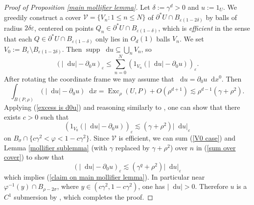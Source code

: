 \documentclass[reqno,11pt]{amsart}
\DeclareMathOperator{\Exc}{Exc}
\DeclareMathOperator{\supp}{supp}
\newcommand*\dif{\mathop{}\!\mathrm{d}}
\newcommand{\dfn}[1]{\emph{#1}\index{#1}}
\theoremstyle{definition}
\numberwithin{equation}{section}
\begin{document}
\begin{proof}[Proof of Proposition \ref{main mollifier lemma}]
Let $\delta := \gamma^d > 0$ and $u := 1_U$.
We greedily construct a cover $\mathcal V = \{V_n: 1 \leq n \leq N\}$ of $\partial^* U \cap B_{\varepsilon(1 - 2\delta)}$ by balls of radius $2\delta\varepsilon$, centered on points $Q_n \in \partial^* U \cap B_{\varepsilon(1 - \delta)}$, which is \dfn{efficient} in the sense that each $Q \in \partial^*U \cap B_{\varepsilon(1 - \delta)}$ only lies in $O_d(1)$ balls $V_n$.
We set $V_0 := B_\varepsilon \setminus B_{\varepsilon(1 - 2\delta)}$.
Then $\supp \dif u \subseteq \bigcup_n V_n$, so
\begin{equation}\label{sum over cover}
(|\dif u| - \partial_0 u)_\varepsilon \leq \sum_{n = 0}^N (1_{V_n} (|\dif u| - \partial_0 u))_\varepsilon.
\end{equation}
After rotating the coordinate frame we may assume that $\dif u = \partial_0 u \dif x^0$. Then
\begin{equation}\label{excess is d0u}
    \int_{B(P, \rho)} (|\dif u| - \partial_0 u) \dif x = \Exc_\rho(U, P) + O(\rho^{d + 1}) \lesssim \rho^{d - 1}(\gamma + \rho^2).
\end{equation}
Applying (\ref{excess is d0u}) and reasoning similarly to \cite[pg92]{Giusti77}, one can show that there exists $c > 0$ such that
\begin{equation}\label{V0 case}
    (1_{V_0} (|\dif u| - \partial_0 u))_\varepsilon \lesssim (\gamma + \rho^2) |\dif u|_\varepsilon
\end{equation}
on $B_\sigma \cap \{c\gamma^2 < \varphi < 1 - c\gamma^2\}$.
Since $\mathcal V$ is efficient, we can sum (\ref{V0 case}) and Lemma \ref{mollifier sublemma} (with $\gamma$ replaced by $\gamma + \rho^2$) over $n$ in (\ref{sum over cover}) to show that
$$(|\dif u| - \partial_0 u)_\varepsilon \lesssim (\gamma^q + \rho^2) |\dif u|_\varepsilon$$
which implies (\ref{claim on main mollifier lemma}).
In particular near $\varphi^{-1}(y) \cap B_{\rho - 2\sigma}$, where $y \in (c\gamma^2, 1 - c\gamma^2)$, one has $|\dif u| > 0$.
Therefore $u$ is a $C^1$ submersion by \cite[Lemma 7.1]{Giusti77}, which completes the proof.
\end{proof}
\end{document}
